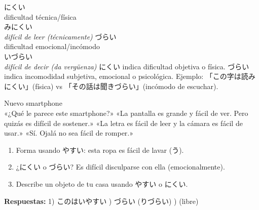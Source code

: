   {にくい\\\small dificultad técnica/física\\\small {}みにくい\\\textit{difícil de leer (técnicamente)}}
  {づらい\\\small dificultad emocional/incómodo\\\small {}いづらい\\\textit{difícil de decir (da vergüenza)}}
  {にくい indica dificultad objetiva o física. づらい indica incomodidad subjetiva, emocional o psicológica. Ejemplo: 「この字は読みにくい」(física) vs 「その話は聞きづらい」(incómodo de escuchar).}



{Nuevo smartphone\\[0.4em]
  «¿Qué le parece este smartphone?» «La pantalla es grande y fácil de ver. Pero quizás es difícil de sostener.» «La letra es fácil de leer y la cámara es fácil de usar.» «Sí. Ojalá no sea fácil de romper.»}

\begin{tcolorbox}[ejerciciobox, title={\emoji{pencil} Ejercicios}]
\begin{enumerate}
  \item Forma usando やすい: esta ropa es fácil de lavar (う).
  \item ¿にくい o づらい? Es difícil disculparse con ella (emocionalmente).
  \item Describe un objeto de tu casa usando やすい o にくい.
\end{enumerate}
\textbf{Respuestas:}
1) このはいやすい ) づらい (りづらい) ) (libre)
\end{tcolorbox}

